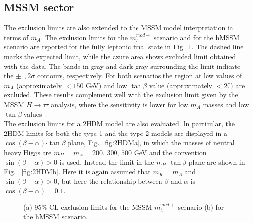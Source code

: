 \subsection*{MSSM sector}
The exclusion limits are also extended to the MSSM model interpretation in terms of $m_A$.
The exclusion limits  for the $m_h^{mod+}$ scenario and for the hMSSM scenario are reported for the fully leptonic final state in Fig.~\ref{fig:MSSM}. 
The dashed line marks the expected limit, while the azure area shows  excluded limit obtained with the data. 
The bands in gray and dark gray surrounding the limit indicate the $\pm 1,2\sigma$ contours, 	respectively. 
For both scenarios the region at low values of $m_{A}$  (approximately $<150$ GeV) and low $\tan \beta$ value (approximately $<$20) are excluded. 
These results complement well with the exclusion limit given by the MSSM $H\rightarrow\tau\tau$ analysis, where the sensitivity is lower for low $m_{A}$ masses 
and low $\tan\beta$ values~\cite{CMS:2017epy}.\\
\newline
The exclusion limits for a 2HDM model are also evaluated.
In particular, the 2HDM limits for both the type-1 and the type-2 models are displayed in a $\cos(\beta-\alpha)$-$\tan\beta$ plane,  Fig.~\ref{fig:2HDMa}, 
in which the masses of neutral heavy Higgs  are $m_{H}=m_{A}=200$, $300$, $500$ GeV and the convention $\sin(\beta-\alpha) > 0$ is used. 
Instead  the limit in the  $m_{H}$-$\tan\beta$ plane are shown in Fig. ~\ref{fig:2HDMb}. 
Here it is again assumed that $m_{H}=m_{A}$ and $\sin(\beta-\alpha) > 0$, but here the relationship between $\beta$ and $\alpha$ is $\cos(\beta-\alpha)=0.1$. 
\begin{figure}[H]
\centering
{}
\caption{(a) 95$\%$ CL exclusion limits for the MSSM $m_h^{mod+}$ scenario (b) for the hMSSM scenario.}
    \label{fig:MSSM}
\end{figure}



